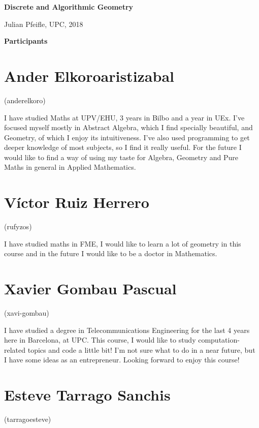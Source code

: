 \documentclass[11pt]{amsart}
\begin{document}
\begin{center}
\textbf{\sffamily
   Discrete and Algorithmic Geometry }

\medskip
   Julian Pfeifle,
   UPC, 2018
\end{center}

\bigskip

\begin{center}
  \textbf{\sffamily Participants}
\end{center}

\medskip

\section*{Ander Elkoroaristizabal}
(anderelkoro)

I have studied Maths at UPV/EHU, 3 years in Bilbo and a year in UEx. I've focused myself mostly in Abstract Algebra, which I find specially beautiful, and Geometry, of which I enjoy its intuitiveness. I've also used programming to get deeper knowledge of most subjects, so I find it really useful. For the future I would like to find a way of using my taste for Algebra, Geometry and Pure Maths in general in Applied Mathematics.

\medskip

\section*{Víctor Ruiz Herrero}
(rufyzos)

I  have  studied  maths  in  FME,  I  would  like  to  learn  a  lot  of  geometry  in  this course and in the future I would like to be a doctor in Mathematics.

\medskip

\section*{Xavier Gombau Pascual}
(xavi-gombau)

I have studied a degree in Telecommunications Engineering for the last 4 years here in Barcelona, at UPC. This course, I would like to study computation-related topics and code a little bit! I'm not sure what to do in a near future, but I have some ideas as an entrepreneur. Looking forward to enjoy this course! 

\medskip

\section*{Esteve Tarrago Sanchis}
(tarragoesteve)
\end{document}
